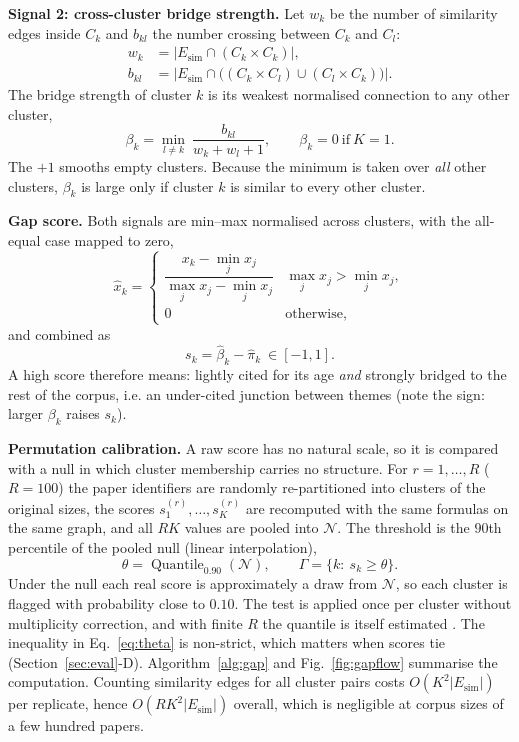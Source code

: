 \documentclass[conference]{IEEEtran}
\newcommand{\norm}[1]{\widehat{#1}}
\DeclareMathOperator{\Quant}{Quantile}
\begin{document}
\textbf{Signal 2: cross-cluster bridge strength.} Let $w_k$ be the number of similarity edges inside $C_k$ and $b_{kl}$ the number crossing between $C_k$ and $C_l$:
\begin{align}
w_k&=\big|E_{\mathrm{sim}}\cap(C_k\times C_k)\big|,\nonumber\\
b_{kl}&=\big|E_{\mathrm{sim}}\cap\big((C_k\times C_l)\cup(C_l\times C_k)\big)\big|.
\label{eq:wb}
\end{align}
The bridge strength of cluster $k$ is its weakest normalised connection to any other cluster,
\begin{equation}
\beta_k=\min_{l\neq k}\ \frac{b_{kl}}{w_k+w_l+1},\qquad \beta_k=0\ \text{if}\ K=1 .
\label{eq:bridge}
\end{equation}
The $+1$ smooths empty clusters. Because the minimum is taken over \emph{all} other clusters, $\beta_k$ is large only if cluster $k$ is similar to every other cluster.

\textbf{Gap score.} Both signals are min--max normalised across clusters, with the all-equal case mapped to zero,
\begin{equation}
\norm{x}_k=\begin{cases}\dfrac{x_k-\min_j x_j}{\max_j x_j-\min_j x_j} & \max_j x_j>\min_j x_j,\\[4pt] 0 & \text{otherwise,}\end{cases}
\label{eq:minmax}
\end{equation}
and combined as
\begin{equation}
s_k=\norm{\beta}_k-\norm{\pi}_k\ \in[-1,1].
\label{eq:score}
\end{equation}
A high score therefore means: lightly cited for its age \emph{and} strongly bridged to the rest of the corpus, i.e. an under-cited junction between themes (note the sign: larger $\beta_k$ raises $s_k$).

\textbf{Permutation calibration.} A raw score has no natural scale, so it is compared with a null in which cluster membership carries no structure. For $r=1,\dots,R$ ($R=100$) the paper identifiers are randomly re-partitioned into clusters of the original sizes, the scores $s^{(r)}_1,\dots,s^{(r)}_K$ are recomputed with the same formulas on the same graph, and all $RK$ values are pooled into $\mathcal{N}$. The threshold is the $90$th percentile of the pooled null (linear interpolation),
\begin{equation}
\theta=\Quant_{0.90}(\mathcal{N}),\qquad \Gamma=\{k:\ s_k\ge\theta\}.
\label{eq:theta}
\end{equation}
Under the null each real score is approximately a draw from $\mathcal{N}$, so each cluster is flagged with probability close to $0.10$. The test is applied once per cluster without multiplicity correction, and with finite $R$ the quantile is itself estimated \cite{efron1979bootstrap,phipson2010permutation}. The inequality in Eq.~\eqref{eq:theta} is non-strict, which matters when scores tie (Section~\ref{sec:eval}-D). Algorithm~\ref{alg:gap} and Fig.~\ref{fig:gapflow} summarise the computation. Counting similarity edges for all cluster pairs costs $O(K^2|E_{\mathrm{sim}}|)$ per replicate, hence $O(RK^2|E_{\mathrm{sim}}|)$ overall, which is negligible at corpus sizes of a few hundred papers.
\end{document}
